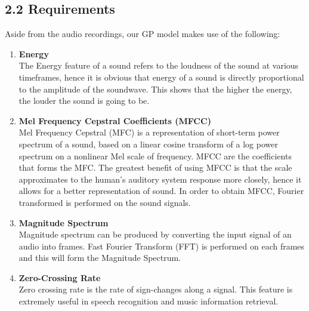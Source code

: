 \documentclass{article}
\begin{document}
	\subsection{2.2 Requirements}
	Aside from the audio recordings, our GP model makes use of the following:
	\begin{enumerate}
		\item \textbf{Energy}	\\
		The Energy feature of a sound refers to the loudness of the sound at various timeframes, 
		hence it is obvious that energy of a sound is directly proportional to the amplitude of the soundwave. 
		This shows that the higher the energy, the louder the sound is going to be.	
	
		\item \textbf{Mel Frequency Cepstral Coefficients (MFCC)} \\
		Mel Frequency Cepstral (MFC) is a representation of short-term power spectrum of a sound, 
		based on a linear cosine transform of a log power spectrum on a nonlinear Mel scale of frequency. 
		MFCC are the coefficients that forms the MFC. The greatest benefit of using MFCC is that the scale approximates to the 
		human's auditory system response more closely, hence it allows for a better representation of sound. 
		In order to obtain MFCC, Fourier transformed is performed on the sound signals.	
	
		\item \textbf{Magnitude Spectrum} \\
		Magnitude spectrum can be produced by converting the input signal of an audio into frames. 
		Fast Fourier Transform (FFT) is performed on each frames and this will form the Magnitude Spectrum.
		
		\item \textbf{Zero-Crossing Rate} \\
		Zero crossing rate is the rate of sign-changes along a signal. This feature is extremely useful in speech recognition and music information retrieval.
	\end{enumerate}
\end{document}
